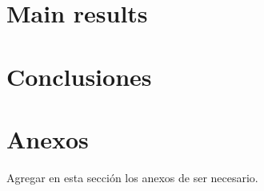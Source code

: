 \documentclass[12pt,oneside]{book}
\theoremstyle{definition}
\begin{document}
\newpage
\chapter{Main results}




\chapter{Conclusiones}









\newpage
{}
\chapter*{Anexos}

Agregar en esta sección los anexos de ser necesario.
\end{document}

